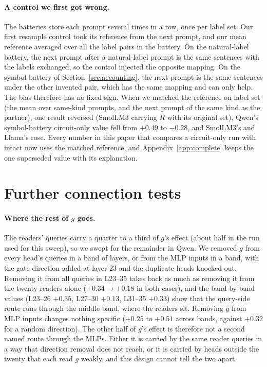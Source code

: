 \documentclass{article}
\begin{document}
\paragraph{A control we first got wrong.} The batteries store each prompt several times in a row, once per label set. Our first resample control took its reference from the next prompt, and our mean reference averaged over all the label pairs in the battery. On the natural-label battery, the next prompt after a natural-label prompt is the same sentences with the labels exchanged, so the control injected the opposite mapping. On the symbol battery of Section~\ref{sec:accounting}, the next prompt is the same sentences under the other invented pair, which has the same mapping and can only help. The bias therefore has no fixed sign. When we matched the reference on label set (the mean over same-kind prompts, and the next prompt of the same kind as the partner), one result reversed (SmolLM3 carrying $R$ with its original set), Qwen's symbol-battery circuit-only value fell from $+0.49$ to $-0.28$, and SmolLM3's and Llama's rose. Every number in this paper that compares a circuit-only run with intact now uses the matched reference, and Appendix~\ref{app:complete} keeps the one superseded value with its explanation.

\section{Further connection tests}\label{app:arrows}
\paragraph{Where the rest of $g$ goes.} The readers' queries carry a quarter to a third of $g$'s effect (about half in the run used for this sweep), so we swept for the remainder in Qwen. We removed $g$ from every head's queries in a band of layers, or from the MLP inputs in a band, with the gate direction added at layer 23 and the duplicate heads knocked out. Removing it from all queries in L23--35 takes back as much as removing it from the twenty readers alone ($+0.34 \to +0.18$ in both cases), and the band-by-band values (L23--26 $+0.35$, L27--30 $+0.13$, L31--35 $+0.33$) show that the query-side route runs through the middle band, where the readers sit. Removing $g$ from MLP inputs changes nothing specific ($+0.25$ to $+0.51$ across bands, against $+0.32$ for a random direction). The other half of $g$'s effect is therefore not a second named route through the MLPs. Either it is carried by the same reader queries in a way that direction removal does not reach, or it is carried by heads outside the twenty that each read $g$ weakly, and this design cannot tell the two apart.
\end{document}
